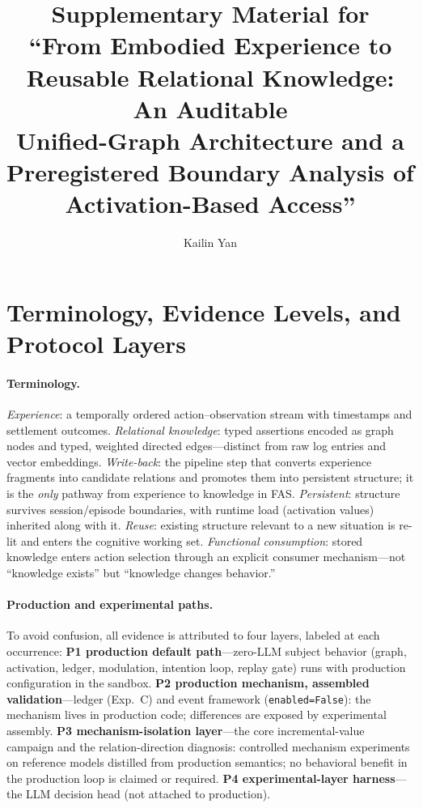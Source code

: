 \documentclass[10pt,a4paper]{article}
\title{\bfseries Supplementary Material for\\
``From Embodied Experience to Reusable Relational Knowledge: An Auditable\\
Unified-Graph Architecture and a Preregistered Boundary Analysis of\\
Activation-Based Access''}
\author{Kailin Yan}
\date{}
\begin{document}
\maketitle

\section{Terminology, Evidence Levels, and Protocol Layers}
\label{s1:term}

\paragraph{Terminology.} \emph{Experience}: a temporally ordered action--observation stream with timestamps and settlement outcomes. \emph{Relational knowledge}: typed assertions encoded as graph nodes and typed, weighted directed edges---distinct from raw log entries and vector embeddings. \emph{Write-back}: the pipeline step that converts experience fragments into candidate relations and promotes them into persistent structure; it is the \emph{only} pathway from experience to knowledge in FAS. \emph{Persistent}: structure survives session/episode boundaries, with runtime load (activation values) inherited along with it. \emph{Reuse}: existing structure relevant to a new situation is re-lit and enters the cognitive working set. \emph{Functional consumption}: stored knowledge enters action selection through an explicit consumer mechanism---not ``knowledge exists'' but ``knowledge changes behavior.''

\paragraph{Production and experimental paths.} To avoid confusion, all evidence is attributed to four layers, labeled at each occurrence: \textbf{P1 production default path}---zero-LLM subject behavior (graph, activation, ledger, modulation, intention loop, replay gate) runs with production configuration in the sandbox. \textbf{P2 production mechanism, assembled validation}---ledger (Exp.~C) and event framework (\texttt{enabled=False}): the mechanism lives in production code; differences are exposed by experimental assembly. \textbf{P3 mechanism-isolation layer}---the core incremental-value campaign and the relation-direction diagnosis: controlled mechanism experiments on reference models distilled from production semantics; no behavioral benefit in the production loop is claimed or required. \textbf{P4 experimental-layer harness}---the LLM decision head (not attached to production).
\end{document}

